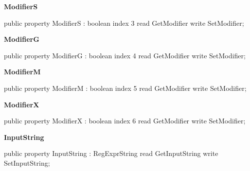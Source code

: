 \documentclass{report}
\newif\ifpdf
\begin{document}
\begin{list}{}
\begin{flushleft}
\ifpdf
\end{flushleft}
\fi


\par  \label{RegExpr.TRegExpr-ModifierS}
\item[\textbf{ModifierS}\hfill]
\ifpdf
\begin{flushleft}
\fi
\begin{ttfamily}
public property ModifierS : boolean index 3 read GetModifier write SetModifier;\end{ttfamily}

\ifpdf
\end{flushleft}
\fi


\par  \label{RegExpr.TRegExpr-ModifierG}
\item[\textbf{ModifierG}\hfill]
\ifpdf
\begin{flushleft}
\fi
\begin{ttfamily}
public property ModifierG : boolean index 4 read GetModifier write SetModifier;\end{ttfamily}

\ifpdf
\end{flushleft}
\fi


\par  \label{RegExpr.TRegExpr-ModifierM}
\item[\textbf{ModifierM}\hfill]
\ifpdf
\begin{flushleft}
\fi
\begin{ttfamily}
public property ModifierM : boolean index 5 read GetModifier write SetModifier;\end{ttfamily}

\ifpdf
\end{flushleft}
\fi


\par  \label{RegExpr.TRegExpr-ModifierX}
\item[\textbf{ModifierX}\hfill]
\ifpdf
\begin{flushleft}
\fi
\begin{ttfamily}
public property ModifierX : boolean index 6 read GetModifier write SetModifier;\end{ttfamily}

\ifpdf
\end{flushleft}
\fi


\par  \label{RegExpr.TRegExpr-InputString}
\item[\textbf{InputString}\hfill]
\ifpdf
\begin{flushleft}
\fi
\begin{ttfamily}
public property InputString : RegExprString read GetInputString write SetInputString;\end{ttfamily}


\end{flushleft}
\end{list}
\end{document}
